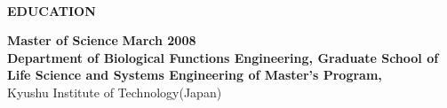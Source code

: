 \begin{center}
    \hrulefill \\
    \begin{large}
        \textbf{EDUCATION} \\
    \end{large} 
\end{center}
\textbf{Master of Science} \hfill \textbf{March 2008}\\
\textbf{Department of Biological Functions Engineering, Graduate School of Life Science and 
Systems Engineering of Master’s Program,} \\
Kyushu Institute of Technology(Japan)
